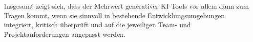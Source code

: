 Insgesamt zeigt sich, dass der Mehrwert generativer KI-Tools vor allem dann zum
Tragen kommt, wenn sie sinnvoll in bestehende Entwicklungsumgebungen
integriert, kritisch überprüft und auf die jeweiligen Team- und
Projektanforderungen angepasst werden.


